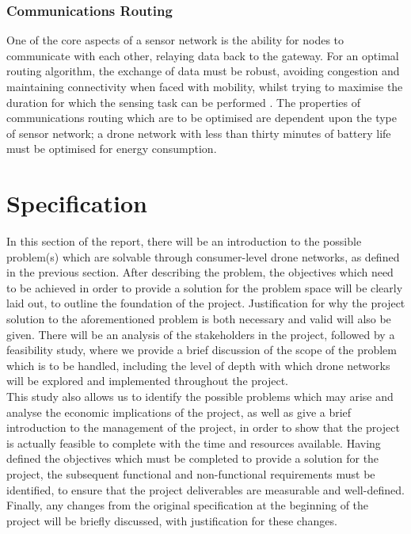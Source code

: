 \documentclass[12pt,a4paper,twoside]{report}
\begin{document}
		\subsection{Communications Routing}
		One of the core aspects of a sensor network is the ability for nodes to communicate with each other, relaying data back to the gateway. For an optimal routing algorithm, the exchange of data must be robust, avoiding congestion and maintaining connectivity when faced with mobility, whilst trying to maximise the duration for which the sensing task can be performed \citep{ curtschurgers2010}. The properties of communications routing which are to be optimised are dependent upon the type of sensor network; a drone network with less than thirty minutes of battery life must be optimised for energy consumption.

\chapter{Specification}
In this section of the report, there will be an introduction to the possible problem(s) which are solvable through consumer-level drone networks, as defined in the previous section. After describing the problem, the objectives which need to be achieved in order to provide a solution for the problem space will be clearly laid out, to outline the foundation of the project. Justification for why the project solution to the aforementioned problem is both necessary and valid will also be given. There will be an analysis of the stakeholders in the project, followed by a feasibility study, where we provide a brief discussion of the scope of the problem which is to be handled, including the level of depth with which drone networks will be explored and implemented throughout the project. \\
This study also allows us to identify the possible problems which may arise and analyse the economic implications of the project, as well as give a brief introduction to the management of the project, in order to show that the project is actually feasible to complete with the time and resources available. Having defined the objectives which must be completed to provide a solution for the project, the subsequent functional and non-functional requirements must be identified, to ensure that the project deliverables are measurable and well-defined. Finally, any changes from the original specification at the beginning of the project will be briefly discussed, with justification for these changes.
\end{document}

